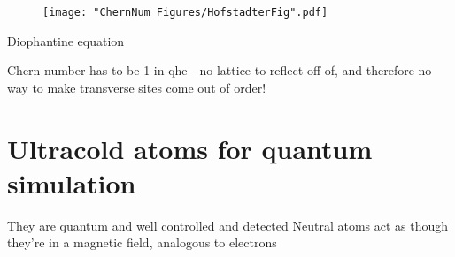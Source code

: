 \begin{figure}
	\texttt{[image: "ChernNum Figures/HofstadterFig".pdf]}
\label{fig:Hofstadter}
\caption{}
\end{figure}
		Diophantine equation 	

Chern number has to be 1 in qhe - no lattice to reflect off of, and therefore no way to make transverse sites come out of order!

\section{Ultracold atoms for quantum simulation}
They are quantum and well controlled and detected
Neutral atoms act as though they're in a magnetic field, analogous to electrons
